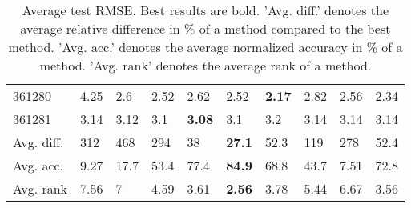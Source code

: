 \begin{table}[ht!]
\begin{tabular}{llllllllll}
  361280 & 4.25 & 2.6 & 2.52 & 2.62 & 2.52 & \textbf{2.17} & 2.82 & 2.56 & 2.34 \\ 
  361281 & 3.14 & 3.12 & 3.1 & \textbf{3.08} & 3.1 & 3.2 & 3.14 & 3.14 & 3.14 \\ 
   \hline
Avg. diff. & 312 & 468 & 294 & 38 & \textbf{27.1} & 52.3 & 119 & 278 & 52.4 \\ 
  Avg. acc. & 9.27 & 17.7 & 53.4 & 77.4 & \textbf{84.9} & 68.8 & 43.7 & 7.51 & 72.8 \\ 
  Avg. rank & 7.56 & 7 & 4.59 & 3.61 & \textbf{2.56} & 3.78 & 5.44 & 6.67 & 3.56 \\ 
   \hline
\hline
\end{tabular}
\endgroup
\caption{Average test RMSE. 
                  Best results are bold. 
                  'Avg. diff.' denotes the average relative difference in \% of a method compared to the best method.
                  'Avg. acc.' denotes the average normalized accuracy in \% of a method.
                  'Avg. rank' denotes the average rank of a method.} 
\label{TABLES/table_results_RMSE_mahalanobis}
\end{table}
